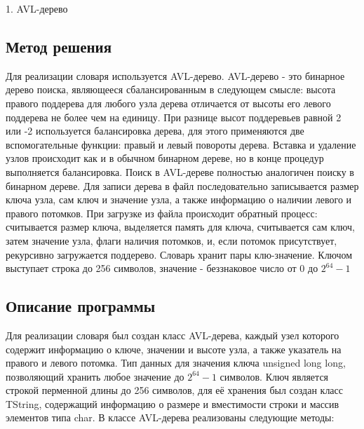 \documentclass[12pt]{article}
\begin{document}
    1. AVL-дерево


\subsection*{Метод решения}

Для реализации словаря используется AVL-дерево.\newline
AVL-дерево - это бинарное дерево поиска, являющееся сбалансированным в следующем смысле: высота правого поддерева для любого узла дерева отличается от высоты его левого поддерева не более чем на единицу.\newline
При разнице высот поддеревьев равной 2 или -2 используется балансировка дерева, для этого применяются две вспомогательные функции: правый и левый повороты дерева.\newline
Вставка и удаление узлов происходит как и в обычном бинарном дереве, но в конце процедур выполняется балансировка.\newline
Поиск в AVL-дереве полностью аналогичен поиску в бинарном дереве.\newline
Для записи дерева в файл последовательно записывается размер ключа узла, сам ключ и значение узла, а также информацию о наличии левого и правого потомков.\newline
При загрузке из файла происходит обратный процесс: считывается размер ключа, выделяется память для ключа, считывается сам ключ, затем значение узла, флаги наличия потомков, и, если потомок присутствует, рекурсивно загружается поддерево.\newline
Словарь хранит пары клю-значение. Ключом выступает строка до 256 символов, значение - беззнаковое число от $0$ до $2^{64} - 1$


\subsection*{Описание программы}

Для реализации словаря был создан класс AVL-дерева, каждый узел которого содержит информацию о ключе, значении и высоте узла, а также указатель на правого и левого потомка. Тип данных для значения ключа unsigned long long, позволяющий хранить любое значение до  $2^{64} - 1$ символов. Ключ является строкой перменной длины до 256 символов, для её хранения был создан класс TString, содержащий информацию о размере и вместимости строки и массив элементов типа char. В классе AVL-дерева реализованы следующие методы:
\end{document}
